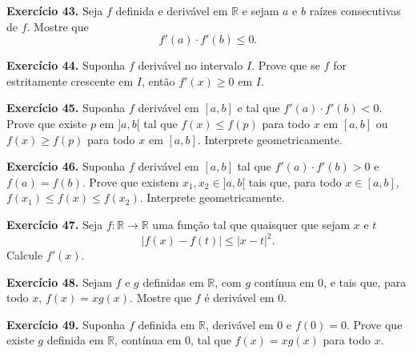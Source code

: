 \documentclass[12pt,a4paper]{article}
\begin{document}
\vspace{0.5cm}
\noindent\textbf{Exercício 43.}
Seja $f$ definida e derivável em $\mathbb{R}$ e sejam $a$ e $b$ raízes consecutivas de $f$. Mostre que
\[
f'(a) \cdot f'(b) \le 0.
\]

\vspace{0.5cm}
\noindent\textbf{Exercício 44.}
Suponha $f$ derivável no intervalo $I$. Prove que se $f$ for estritamente crescente em $I$, então $f'(x) \ge 0$ em $I$.

\vspace{0.5cm}
\noindent\textbf{Exercício 45.}
Suponha $f$ derivável em $[a, b]$ e tal que $f'(a) \cdot f'(b) < 0$. Prove que existe $p$ em ${]a, b[}$ tal que $f(x) \le f(p)$ para todo $x$ em $[a, b]$ ou $f(x) \ge f(p)$ para todo $x$ em $[a, b]$. Interprete geometricamente.

\vspace{0.5cm}
\noindent\textbf{Exercício 46.}
Suponha $f$ derivável em $[a, b]$ tal que $f'(a) \cdot f'(b) > 0$ e $f(a) = f(b)$. Prove que existem $x_1, x_2 \in {]a, b[}$ tais que, para todo $x \in [a, b]$, $f(x_1) \le f(x) \le f(x_2)$. Interprete geometricamente.

\vspace{0.5cm}
\noindent\textbf{Exercício 47.}
Seja $f\colon \mathbb{R} \to \mathbb{R}$ uma função tal que quaisquer que sejam $x$ e $t$
\[
|f(x) - f(t)| \le |x - t|^2.
\]
Calcule $f'(x)$.

\vspace{0.5cm}
\noindent\textbf{Exercício 48.}
Sejam $f$ e $g$ definidas em $\mathbb{R}$, com $g$ contínua em 0, e tais que, para todo $x$, $f(x) = xg(x)$. Mostre que $f$ é derivável em 0.

\vspace{0.5cm}
\noindent\textbf{Exercício 49.}
Suponha $f$ definida em $\mathbb{R}$, derivável em 0 e $f(0) = 0$. Prove que existe $g$ definida em $\mathbb{R}$, contínua em 0, tal que $f(x) = xg(x)$ para todo $x$.
\end{document}
